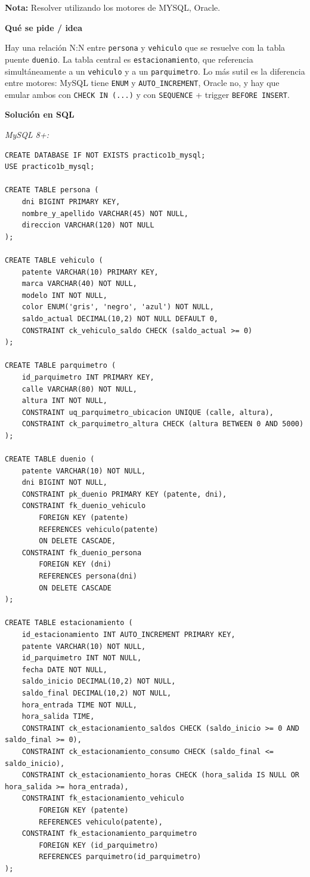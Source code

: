\documentclass[11pt,a4paper]{article}
\newcommand{\itemcabecera}[1]{\noindent\textbf{#1}\par\medskip}
\newcommand{\bloqueIdea}{\itemcabecera{Qu\'e se pide / idea}}
\newcommand{\bloqueSolucion}{\itemcabecera{Soluci\'on en SQL}}
\begin{document}
\textbf{Nota:} Resolver utilizando los motores de MYSQL, Oracle.

\bloqueIdea

Hay una relación N:N entre \texttt{persona} y \texttt{vehiculo} que se resuelve con la tabla puente \texttt{duenio}. La tabla central es \texttt{estacionamiento}, que referencia simultáneamente a un \texttt{vehiculo} y a un \texttt{parquimetro}. Lo más sutil es la diferencia entre motores: MySQL tiene \texttt{ENUM} y \texttt{AUTO\_INCREMENT}, Oracle no, y hay que emular ambos con \texttt{CHECK IN (...)} y con \texttt{SEQUENCE} + trigger \texttt{BEFORE INSERT}.

\bloqueSolucion

\textit{MySQL 8+:}

\begin{lstlisting}
CREATE DATABASE IF NOT EXISTS practico1b_mysql;
USE practico1b_mysql;

CREATE TABLE persona (
    dni BIGINT PRIMARY KEY,
    nombre_y_apellido VARCHAR(45) NOT NULL,
    direccion VARCHAR(120) NOT NULL
);

CREATE TABLE vehiculo (
    patente VARCHAR(10) PRIMARY KEY,
    marca VARCHAR(40) NOT NULL,
    modelo INT NOT NULL,
    color ENUM('gris', 'negro', 'azul') NOT NULL,
    saldo_actual DECIMAL(10,2) NOT NULL DEFAULT 0,
    CONSTRAINT ck_vehiculo_saldo CHECK (saldo_actual >= 0)
);

CREATE TABLE parquimetro (
    id_parquimetro INT PRIMARY KEY,
    calle VARCHAR(80) NOT NULL,
    altura INT NOT NULL,
    CONSTRAINT uq_parquimetro_ubicacion UNIQUE (calle, altura),
    CONSTRAINT ck_parquimetro_altura CHECK (altura BETWEEN 0 AND 5000)
);

CREATE TABLE duenio (
    patente VARCHAR(10) NOT NULL,
    dni BIGINT NOT NULL,
    CONSTRAINT pk_duenio PRIMARY KEY (patente, dni),
    CONSTRAINT fk_duenio_vehiculo
        FOREIGN KEY (patente)
        REFERENCES vehiculo(patente)
        ON DELETE CASCADE,
    CONSTRAINT fk_duenio_persona
        FOREIGN KEY (dni)
        REFERENCES persona(dni)
        ON DELETE CASCADE
);

CREATE TABLE estacionamiento (
    id_estacionamiento INT AUTO_INCREMENT PRIMARY KEY,
    patente VARCHAR(10) NOT NULL,
    id_parquimetro INT NOT NULL,
    fecha DATE NOT NULL,
    saldo_inicio DECIMAL(10,2) NOT NULL,
    saldo_final DECIMAL(10,2) NOT NULL,
    hora_entrada TIME NOT NULL,
    hora_salida TIME,
    CONSTRAINT ck_estacionamiento_saldos CHECK (saldo_inicio >= 0 AND saldo_final >= 0),
    CONSTRAINT ck_estacionamiento_consumo CHECK (saldo_final <= saldo_inicio),
    CONSTRAINT ck_estacionamiento_horas CHECK (hora_salida IS NULL OR hora_salida >= hora_entrada),
    CONSTRAINT fk_estacionamiento_vehiculo
        FOREIGN KEY (patente)
        REFERENCES vehiculo(patente),
    CONSTRAINT fk_estacionamiento_parquimetro
        FOREIGN KEY (id_parquimetro)
        REFERENCES parquimetro(id_parquimetro)
);
\end{lstlisting}
\end{document}
